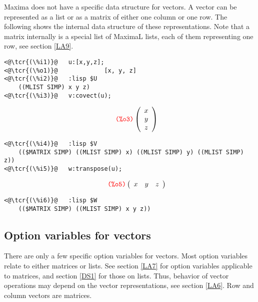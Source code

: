 \documentclass[../Maxima_Workbook.tex]{subfiles}
\begin{document}
Maxima does not have a specific data structure for vectors. A vector can be represented as a list or as a matrix of either one column or one row. The following shows the internal data structure of these representations. Note that a matrix internally is a special list of MaximaL lists, each of them representing one row, see section \ref{LA9}.

\lz \begin{small}
\color{blue}
\begin{lstlisting}
<@\tcr{(\%i1)}@   u:[x,y,z];
<@\tcr{(\%o1)}@			    [x, y, z]
<@\tcr{(\%i2)}@   :lisp $U
	((MLIST SIMP) x y z)
<@\tcr{(\%i3)}@   v:covect(u);
\end{lstlisting}
\vspace{-4mm} \[\tag*{\tcr{\ttfamily (\%o3)}} \left( \begin{array} {c} x \\ y \\ z \end{array} \right) \]
\vspace{-6mm} \begin{lstlisting}
<@\tcr{(\%i4)}@   :lisp $V
	(($MATRIX SIMP) ((MLIST SIMP) x) ((MLIST SIMP) y) ((MLIST SIMP) z))
<@\tcr{(\%i5)}@   w:transpose(u);
\end{lstlisting}
\vspace{-5mm} \[\tag*{\tcr{\ttfamily (\%o5)}} \left( \begin{array} {ccc} x & y & z \end{array} \right) \]
\vspace{-7mm} \begin{lstlisting}
<@\tcr{(\%i6)}@   :lisp $W
	(($MATRIX SIMP) ((MLIST SIMP) x y z))
\end{lstlisting}
\color{black}
\end{small}

\subsection{Option variables for vectors}\label{LA8}

There are only a few specific option variables for vectors. Most option variables relate to either matrices or lists. See section \ref{LA7} for option variables applicable to matrices, and section \ref{DS1} for those on lists. Thus, behavior of vector operations may depend on the vector representations, see section \ref{LA6}. Row and column vectors are matrices.

\lzz {} \qquad {} \hfill {}
\end{document}
